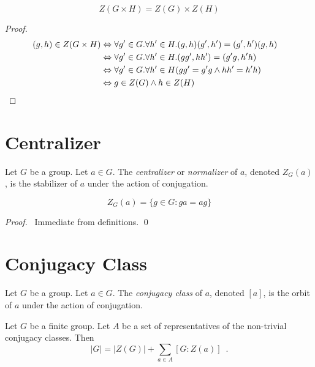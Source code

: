 \begin{prop}
\label{prop:center-of-G-times-H}
\[ Z(G \times H) = Z(G) \times Z(H) \]
\end{prop}

\begin{proof}
\pf
\begin{align*}
(g,h) \in Z(G \times H) & \Leftrightarrow \forall g' \in G. \forall h' \in H. (g,h) (g',h') = (g',h')(g,h) \\
& \Leftrightarrow \forall g' \in G. \forall h' \in H. (gg',hh') = (g'g,h'h) \\
& \Leftrightarrow \forall g' \in G. \forall h' \in H (gg' = g'g \wedge hh' = h'h) \\
& \Leftrightarrow g \in Z(G) \wedge h \in Z(H) & \qed
\end{align*}
\end{proof}

\section{Centralizer}

\begin{df}[Centralizer]
Let $G$ be a group. Let $a \in G$. The \emph{centralizer} or \emph{normalizer} of $a$, denoted $Z_G(a)$, is the stabilizer of $a$ under the action of conjugation.
\end{df}

\begin{prop}
\[ Z_G(a) = \{ g \in G : ga = ag \} \]
\end{prop}

\begin{proof}
\pf\ Immediate from definitions. \qed
\end{proof}

\section{Conjugacy Class}

\begin{df}
Let $G$ be a group. Let $a \in G$. The \emph{conjugacy class} of $a$, denoted $[a]$, is the orbit of $a$ under the action of conjugation.
\end{df}

\begin{prop}
Let $G$ be a finite group. Let $A$ be a set of representatives of the non-trivial conjugacy classes. Then
\[ |G| = |Z(G)| + \sum_{a \in A} [G : Z(a)] \enspace . \]
\end{prop}

